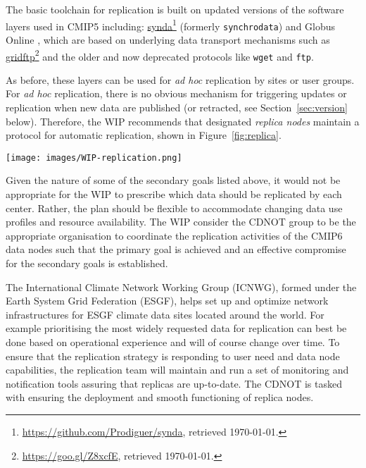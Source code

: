 \documentclass[gmd,manuscript]{copernicus}
\newcommand{\urlref}[2] {\href{#1}{#2}\footnote{\url{#1}, retrieved \today.}}
\begin{document}
The basic toolchain for replication is built on updated versions of
the software layers used in CMIP5 including:
\urlref{https://github.com/Prodiguer/synda}{synda} (formerly
\texttt{synchrodata}) and Globus Online \citep{ref:chardetal2015}, which
are based on underlying data transport mechanisms such as
\urlref{https://goo.gl/Z8xcfE}{gridftp} and the older and now deprecated
protocols like \texttt{wget} and \texttt{ftp}.

As before, these layers can be used for \emph{ad hoc} replication by
sites or user groups. For \emph{ad hoc} replication, there is no
obvious mechanism for triggering updates or replication when new data
are published (or retracted, see Section~\ref{sec:version} below). Therefore,
the WIP recommends that designated \emph{replica nodes} maintain a
protocol for automatic replication, shown in Figure~\ref{fig:replica}.

\begin{figure*}
  \begin{center}
    \texttt{[image: images/WIP-replication.png]}
  \end{center}
  \caption{CMIP6 replication from data nodes to replica centers and
    between replica centers coordinated by a CMIP6 replication team.}
  \label{fig:replica}
\end{figure*}

Given the nature of some of the secondary goals listed above, it would
not be appropriate for the WIP to prescribe which data should be
replicated by each center. Rather, the plan should be flexible to
accommodate changing data use profiles and resource availability. The
WIP consider the CDNOT group to be the appropriate organisation to
coordinate the replication activities of the CMIP6 data nodes such
that the primary goal is achieved and an effective compromise for the
secondary goals is established.

The International Climate Network Working Group (ICNWG), formed under
the Earth System Grid Federation (ESGF), helps set up and optimize
network infrastructures for ESGF climate data sites located around the
world. For example prioritising the most widely requested data for
replication can best be done based on operational experience and will
of course change over time. To ensure that the replication strategy is
responding to user need and data node capabilities, the replication
team will maintain and run a set of monitoring and notification tools
assuring that replicas are up-to-date. The CDNOT is tasked with
ensuring the deployment and smooth functioning of replica nodes.
\end{document}
